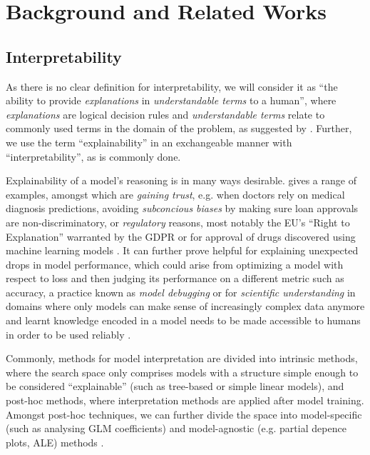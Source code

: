 \documentclass[twoside,11pt]{article}
\begin{document}
\section{Background and Related Works}

\subsection{Interpretability}
As there is no clear definition for interpretability, we will consider it as ``the ability to provide \textit{explanations} in \textit{understandable terms} to a human'',
where \textit{explanations} are logical decision rules and \textit{understandable terms} relate to commonly used terms in the domain of the problem,
as suggested by \citet[p. 726]{survey_NN_interpretability}. Further, we use the term ``explainability'' in an exchangeable manner with ``interpretability'',
as is commonly done.

Explainability of a model's reasoning is in many ways desirable. \citet[pp. 3f]{Zach2019InterpretabilityOD} gives a range of examples,
amongst which are \textit{gaining trust}, e.g. when doctors rely on medical diagnosis predictions, avoiding \textit{subconcious biases} by
making sure loan approvals are non-discriminatory, or \textit{regulatory} reasons, most notably the EU's ``Right to Explanation'' warranted by the
GDPR \citep[p. 1]{review_NN_interpretability} or for approval of drugs discovered using machine learning models \citep[pp. 727f]{survey_NN_interpretability}.
It can further prove helpful for explaining unexpected drops in model performance, which could arise from optimizing a model with respect to loss and then judging its
performance on a different metric such as accuracy, a practice known as \textit{model debugging} \citep[pp. 727f]{survey_NN_interpretability} or for
\textit{scientific understanding} in domains where only models can make sense of increasingly complex data anymore and learnt knowledge encoded in a model needs to be
made accessible to humans in order to be used reliably \citep[p. 1]{review_NN_interpretability}.

Commonly, methods for model interpretation are divided into intrinsic methods, where the search space only comprises models with a structure simple enough to be
considered ``explainable'' (such as tree-based or simple linear models), and post-hoc methods, where interpretation methods are applied after model training.
Amongst post-hoc techniques, we can further divide the space into model-specific (such as analysing GLM coefficients) and model-agnostic
(e.g. partial depence plots, ALE) methods \citep[chap. 3.2]{molnar2022}.
\end{document}
